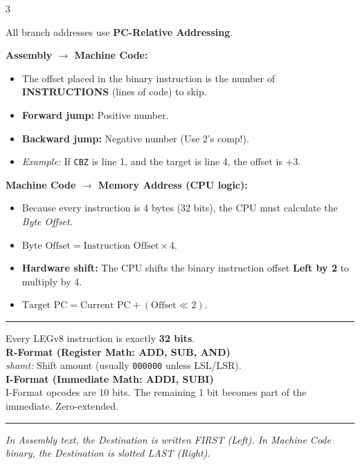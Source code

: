 \documentclass[6pt, letterpaper]{article}
\newcommand{\sectionhead}[1]{%
    \vspace{1mm}{\large\bfseries#1}\vspace{0.2mm}\hrule\vspace{0.8mm}%
}
\begin{document}
\begin{multicols}{3}
\begin{tcolorbox}[colback=blue!5, colframe=black, boxrule=0.5pt, title=\textbf{Branch Offset Calculation}]
All branch addresses use \textbf{PC-Relative Addressing}.

\textbf{Assembly $\to$ Machine Code:}
\begin{itemize}
    \item The offset placed in the binary instruction is the number of \textbf{INSTRUCTIONS} (lines of code) to skip.
    \item \textbf{Forward jump:} Positive number.
    \item \textbf{Backward jump:} Negative number (Use 2's comp!).
    \item \textit{Example:} If \texttt{CBZ} is line 1, and the target is line 4, the offset is $+3$.
\end{itemize}

\textbf{Machine Code $\to$ Memory Address (CPU logic):}
\begin{itemize}
    \item Because every instruction is 4 bytes (32 bits), the CPU must calculate the \textit{Byte Offset}.
    \item $\text{Byte Offset} = \text{Instruction Offset} \times 4$.
    \item \textbf{Hardware shift:} The CPU shifts the binary instruction offset \textbf{Left by 2} to multiply by 4.
    \item $\text{Target PC} = \text{Current PC} + (\text{Offset} \ll 2)$.
\end{itemize}
\end{tcolorbox}


\sectionhead{Instruction Formats}
Every LEGv8 instruction is exactly \textbf{32 bits}. \\

\textbf{R-Format (Register Math: ADD, SUB, AND)} \\
\textit{shamt:} Shift amount (usually \texttt{000000} unless LSL/LSR). \\

\textbf{I-Format (Immediate Math: ADDI, SUBI)} \\
I-Format opcodes are 10 bits. The remaining 1 bit becomes part of the immediate. Zero-extended. \\

\columnbreak


\sectionhead{Instruction Syntax \& Behavior Guide}
\textit{In Assembly text, the Destination is written FIRST (Left). In Machine Code binary, the Destination is slotted LAST (Right).}


\end{multicols}
\end{document}
